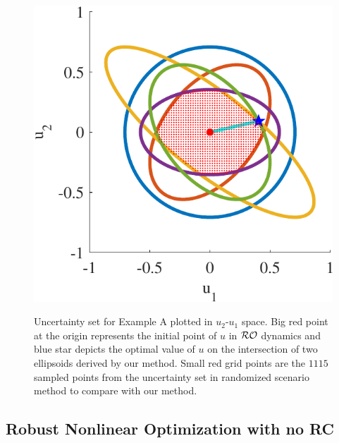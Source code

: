 \documentclass[journal,twoside,web]{ieeecolor}
\begin{document}
\begin{figure}
\begin{center}
\includegraphics[scale=0.55]{ellipsoids}
\vspace{-1.5mm}
{\color{blue}\caption{Uncertainty set for Example A plotted in $u_
2$-$u_1$ space. Big red point at the origin represents the initial point of $u$ in ${\cal RO}$ dynamics and blue star depicts the optimal value of $u$ on the intersection of two ellipsoids derived by our method. Small red grid points are the $1115$ sampled points from the uncertainty set in randomized scenario method \cite{calafiore2004} to compare with our method.}}
\vspace{-8mm}
\label{ellipsoids}
\end{center}
\end{figure}


\subsection{Robust Nonlinear Optimization with no RC}\label{norc.sec}
\end{document}

